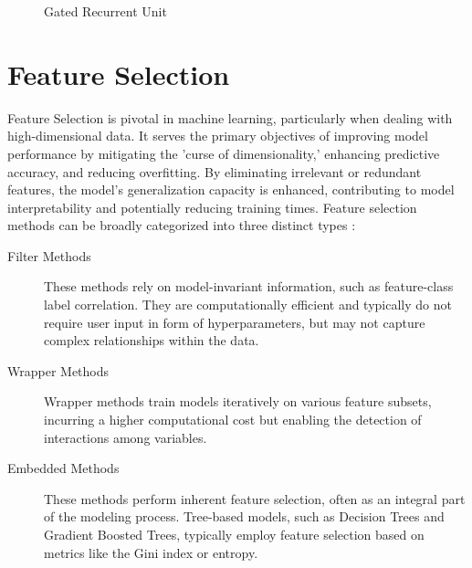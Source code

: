 \documentclass[12pt, a4paper, headinclude, twoside, plainheadsepline, open=right, numbers=noenddot, hidelinks, toc=listof, toc=bibliography]{scrreprt}
\begin{document}
\begin{figure}
\caption{Gated Recurrent Unit}
\label{fig:gru}
\end{figure}


\section{Feature Selection}
\label{sec:fs_algos}

Feature Selection is pivotal in machine learning, particularly when dealing with high-dimensional data. It serves the primary objectives of improving model performance by mitigating the 'curse of dimensionality,' enhancing predictive accuracy, and reducing overfitting. By eliminating irrelevant or redundant features, the model's generalization capacity is enhanced, contributing to model interpretability and potentially reducing training times.
Feature selection methods can be broadly categorized into three distinct types \cite{jovicReviewFeatureSelection2015}:
\begin{description}

\item[Filter Methods] These methods rely on model-invariant information, such as feature-class label correlation. They are computationally efficient and typically do not require user input in form of hyperparameters, but may not capture complex relationships within the data.

\item[Wrapper Methods] Wrapper methods train models iteratively on various feature subsets, incurring a higher computational cost but enabling the detection of interactions among variables.

\item[Embedded Methods] These methods perform inherent feature selection, often as an integral part of the modeling process. Tree-based models, such as Decision Trees and Gradient Boosted Trees, typically employ feature selection based on metrics like the Gini index or entropy.
\end{description}
\end{document}
